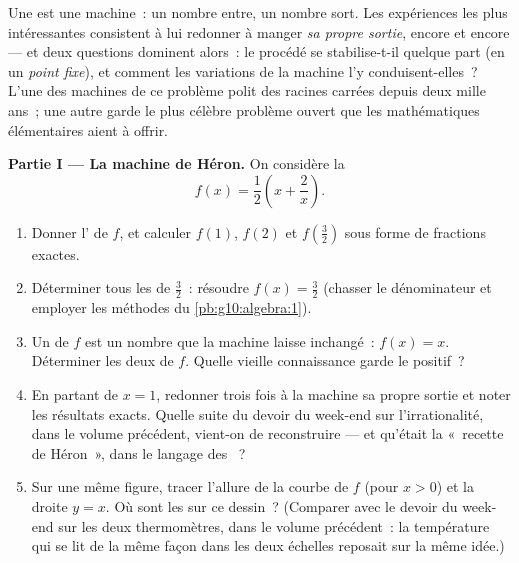 \begin{problem}
\label{pb:g10:functions:1}
Une  est une machine~: un nombre entre, un nombre sort. Les
expériences les plus intéressantes consistent à lui redonner à manger
\emph{sa propre sortie}, encore et encore --- et deux questions
dominent alors~: le procédé se stabilise-t-il quelque part (en un
\emph{point fixe}), et comment les variations de la
machine l'y conduisent-elles~? L'une des machines de ce problème
polit des racines carrées depuis deux mille ans~; une autre garde le
plus célèbre problème ouvert que les mathématiques élémentaires aient
à offrir.

\medskip
\noindent\textbf{Partie I --- La machine de Héron.}
On considère la 
\[
f(x) = \frac12\left(x + \frac2x\right).
\]
\begin{enumerate}
  \item Donner l' de $f$, et calculer $f(1)$,
        $f(2)$ et $f\!\left(\frac32\right)$ sous forme de fractions
        exactes.
  \item Déterminer tous les  de $\frac32$~: résoudre
        $f(x) = \frac32$ (chasser le dénominateur et employer les
        méthodes du \cref{pb:g10:algebra:1}).
  \item Un \emph{} de $f$ est un nombre que la machine
        laisse inchangé~: $f(x) = x$. Déterminer les deux  de $f$. Quelle vieille connaissance garde le 
        positif~?
  \item En partant de $x = 1$, redonner trois fois à la machine sa
        propre sortie et noter les résultats exacts. Quelle suite du
        devoir du week-end sur l'irrationalité, dans le volume
        précédent, vient-on de reconstruire --- et qu'était la
        «~recette de Héron~», dans le langage des ~?
  \item Sur une même figure, tracer l'allure de la courbe de $f$
        (pour $x > 0$) et la droite $y = x$. Où sont les 
        sur ce dessin~? (Comparer avec le devoir du week-end sur les
        deux thermomètres, dans le volume précédent~: la température
        qui se lit de la même façon dans les deux échelles reposait
        sur la même idée.)
\end{enumerate}


\end{problem}
